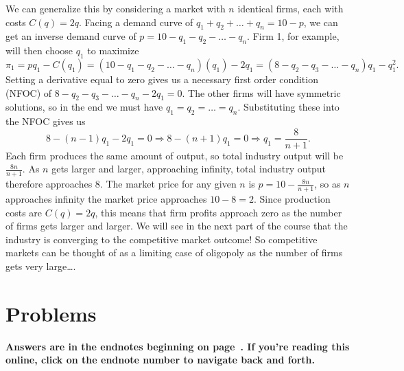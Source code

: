 We can generalize this by considering a market with $n$ identical firms, each with costs $C(q)=2q$. Facing a demand curve of $q_1+q_2+\ldots +q_n=10-p$, we can get an inverse demand curve of $p=10-q_1-q_2-\ldots -q_n$. Firm 1, for example, will then choose $q_1$ to maximize
\[
\pi_1=pq_1-C(q_1)=(10-q_1-q_2-\ldots -q_n)(q_1)-2q_1=(8-q_2-q_3-\ldots -q_n)q_1 - q_1^2.
\]
Setting a derivative equal to zero gives us a necessary first order condition (NFOC) of $8-q_2-q_3-\ldots -q_n-2q_1=0$. The other firms will have symmetric solutions, so in the end we must have $q_1=q_2=\ldots =q_n$. Substituting these into the NFOC gives us
\[
8-(n-1)q_1-2q_1=0\Longrightarrow 8-(n+1)q_1=0\Longrightarrow q_1=\frac{8}{n+1}.
\]
Each firm produces the same amount of output, so total industry output will be $\displaystyle\frac{8n}{n+1}$. As $n$ gets larger and larger, approaching infinity, total industry output therefore approaches 8. The market price for any given $n$ is $\displaystyle p=10-\frac{8n}{n+1}$, so as $n$ approaches infinity the market price approaches $10-8=2$. Since production costs are $C(q)=2q$, this means that firm profits approach zero as the number of firms gets larger and larger. We will see in the next part of the course that the industry is converging to the competitive market outcome! So competitive markets can be thought of as a limiting case of oligopoly as the number of firms gets very large\ldots.
%
%
%


\bigskip
\bigskip
\section*{Problems}

\noindent \textbf{Answers are in the endnotes beginning on page~\pageref{4duopolya}. If you're reading this online, click on the endnote number to navigate back and forth.}



